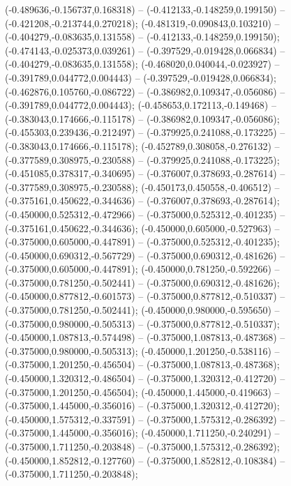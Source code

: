  (-0.489636,-0.156737,0.168318) -- (-0.412133,-0.148259,0.199150) -- (-0.421208,-0.213744,0.270218);
 (-0.481319,-0.090843,0.103210) -- (-0.404279,-0.083635,0.131558) -- (-0.412133,-0.148259,0.199150);
 (-0.474143,-0.025373,0.039261) -- (-0.397529,-0.019428,0.066834) -- (-0.404279,-0.083635,0.131558);
 (-0.468020,0.040044,-0.023927) -- (-0.391789,0.044772,0.004443) -- (-0.397529,-0.019428,0.066834);
 (-0.462876,0.105760,-0.086722) -- (-0.386982,0.109347,-0.056086) -- (-0.391789,0.044772,0.004443);
 (-0.458653,0.172113,-0.149468) -- (-0.383043,0.174666,-0.115178) -- (-0.386982,0.109347,-0.056086);
 (-0.455303,0.239436,-0.212497) -- (-0.379925,0.241088,-0.173225) -- (-0.383043,0.174666,-0.115178);
 (-0.452789,0.308058,-0.276132) -- (-0.377589,0.308975,-0.230588) -- (-0.379925,0.241088,-0.173225);
 (-0.451085,0.378317,-0.340695) -- (-0.376007,0.378693,-0.287614) -- (-0.377589,0.308975,-0.230588);
 (-0.450173,0.450558,-0.406512) -- (-0.375161,0.450622,-0.344636) -- (-0.376007,0.378693,-0.287614);
 (-0.450000,0.525312,-0.472966) -- (-0.375000,0.525312,-0.401235) -- (-0.375161,0.450622,-0.344636);
 (-0.450000,0.605000,-0.527963) -- (-0.375000,0.605000,-0.447891) -- (-0.375000,0.525312,-0.401235);
 (-0.450000,0.690312,-0.567729) -- (-0.375000,0.690312,-0.481626) -- (-0.375000,0.605000,-0.447891);
 (-0.450000,0.781250,-0.592266) -- (-0.375000,0.781250,-0.502441) -- (-0.375000,0.690312,-0.481626);
 (-0.450000,0.877812,-0.601573) -- (-0.375000,0.877812,-0.510337) -- (-0.375000,0.781250,-0.502441);
 (-0.450000,0.980000,-0.595650) -- (-0.375000,0.980000,-0.505313) -- (-0.375000,0.877812,-0.510337);
 (-0.450000,1.087813,-0.574498) -- (-0.375000,1.087813,-0.487368) -- (-0.375000,0.980000,-0.505313);
 (-0.450000,1.201250,-0.538116) -- (-0.375000,1.201250,-0.456504) -- (-0.375000,1.087813,-0.487368);
 (-0.450000,1.320312,-0.486504) -- (-0.375000,1.320312,-0.412720) -- (-0.375000,1.201250,-0.456504);
 (-0.450000,1.445000,-0.419663) -- (-0.375000,1.445000,-0.356016) -- (-0.375000,1.320312,-0.412720);
 (-0.450000,1.575312,-0.337591) -- (-0.375000,1.575312,-0.286392) -- (-0.375000,1.445000,-0.356016);
 (-0.450000,1.711250,-0.240291) -- (-0.375000,1.711250,-0.203848) -- (-0.375000,1.575312,-0.286392);
 (-0.450000,1.852812,-0.127760) -- (-0.375000,1.852812,-0.108384) -- (-0.375000,1.711250,-0.203848);
